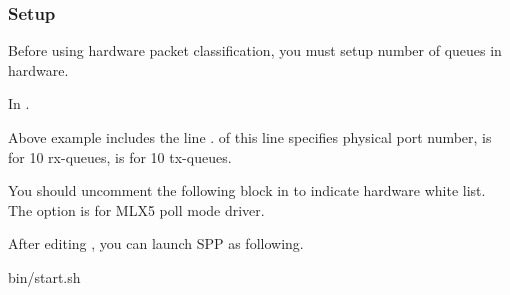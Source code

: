 \documentclass[a4paper,11pt,openany,oneside,english]{sphinxmanual}
\begin{document}
\begin{figure}[htbp]
\centering

\noindent{}
\end{figure}


\subsubsection{Setup}
\label{\detokenize{usecases/hardware-offload:setup}}
Before using hardware packet classification, you must setup number of queues
in hardware.

In .

\begin{sphinxVerbatim}[commandchars=\\\{\},formatcom=\footnotesize]
\end{sphinxVerbatim}

Above example includes the line . 
of this line specifies physical port number,  is for 10 rx-queues,
 is for 10 tx-queues.

You should uncomment the following block in 
to indicate hardware white list. The option 
is for MLX5 poll mode driver.

\begin{sphinxVerbatim}[commandchars=\\\{\},formatcom=\footnotesize]
\end{sphinxVerbatim}

After editing , you can launch SPP as following.

\begin{sphinxVerbatim}[commandchars=\\\{\},formatcom=\footnotesize]
 bin/start.sh
\end{sphinxVerbatim}
\end{document}
